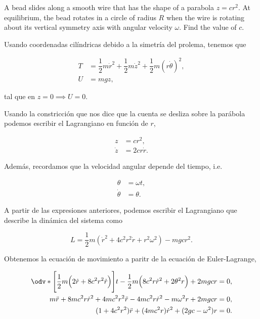 \documentclass[../main.tex]{subfiles}
\begin{document}
\begin{problema}
	A bead slides along a smooth wire that has the shape of a parabola
	\(z = cr^{2}\). At equilibrium, the bead rotates in a circle of radius \(R\)
	when the wire is rotating about its vertical symmetry axis with angular velocity
	\(\omega\). Find the value of \(c\).

	\startsolution

	Usando coordenadas cilíndricas debido a la simetría del prolema, tenemos que

	\begin{align*}
		T & = \dfrac{1}{2}m \dot{r}^{2} + \dfrac{1}{2}m \dot{z}^{2} + \dfrac{1}{2}m(r \dot{\theta})^{2}, \\
		U & = mgz,
	\end{align*}

	tal que en \(z = 0 \implies U = 0\).

	Usando la constricción que nos dice que la cuenta se desliza sobre la parábola
	podemos escribir el Lagrangiano en función de \(r\),

	\begin{align*}
		z       & = cr^{2},      \\
		\dot{z} & = 2cr \dot{r}.
	\end{align*}

	Además, recordamos que la velocidad angular depende del tiempo, i.e.

	\begin{align*}
		\theta       & = \omega t, \\
		\dot{\theta} & = \theta.
	\end{align*}

	A partir de las expresiones anteriores, podemos escribir el Lagrangiano que
	describe la dinámica del sistema como

	\begin{equation*}
		L  = \dfrac{1}{2}m(\dot{r}^{2} + 4c^{2}r^{2} \dot{r} + r^{2}\omega^{2}) - mgcr^{2}.
	\end{equation*}

	Obtenemos la ecuación de movimiento a paritr de la ecuación de Euler-Lagrange,

	\begin{align*}
		\odv*{\Biggl[\dfrac{1}{2}m \Bigl(2 \dot{r} + 8c^{2}r^{2} \dot{r}\Bigr)\Biggr]}{t} - \dfrac{1}{2}m \Bigl(8c^{2}r \dot{r}^{2} + 2\theta^{2}r\Bigr) + 2mgcr & = 0, \\
		m \ddot{r} + 8mc^{2}r \dot{r}^{2} + 4mc^{2}r^{2}\ddot{r} - 4mc^{2}r \dot{r}^{2} - m\omega^{2}r + 2mgcr                                                   & = 0, \\
		(1 + 4c^{2}r^{2})\ddot{r} + (4mc^{2}r)\dot{r}^{2} + (2gc - \omega^{2})r                                                                                  & = 0.
	\end{align*}


\end{problema}
\end{document}

